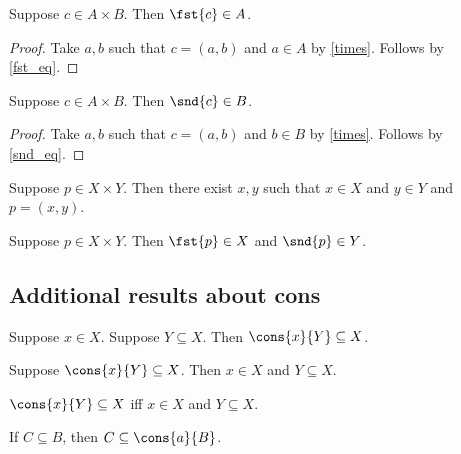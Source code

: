 \begin{proposition}\label{fst_type}
    Suppose $c\in A\times B$. Then $\fst{c}\in A$.
\end{proposition}
\begin{proof}
    Take $a, b$ such that $c = (a, b)$ and $a\in A$
        by \cref{times}.
    Follows by \cref{fst_eq}.
\end{proof}

\begin{proposition}\label{snd_type}
    Suppose $c\in A\times B$. Then $\snd{c}\in B$.
\end{proposition}
\begin{proof}
    Take $a, b$ such that $c = (a, b)$ and $b\in B$
        by \cref{times}.
    Follows by \cref{snd_eq}.
\end{proof}

\begin{proposition}\label{times_elem_is_tuple}
    Suppose $p\in X\times Y$. Then there exist $x, y$
    such that $x\in X$ and $y\in Y$ and $p = (x, y)$.
\end{proposition}


\begin{proposition}\label{times_proj_elim}
    Suppose $p\in X\times Y$. Then $\fst{p}\in X$ and $\snd{p}\in Y$.
\end{proposition}
\subsection{Additional results about cons}

\begin{proposition}\label{cons_subseteq_intro}
    Suppose $x\in X$.
    Suppose $Y\subseteq X$.
    Then $\cons{x}{Y}\subseteq X$.
\end{proposition}

\begin{proposition}\label{cons_subseteq_elim}
    Suppose $\cons{x}{Y}\subseteq X$.
    Then $x\in X$ and $Y\subseteq X$.
\end{proposition}

\begin{proposition}\label{cons_subseteq_iff}
    $\cons{x}{Y}\subseteq X$ iff $x\in X$ and $Y\subseteq X$.
\end{proposition}

\begin{proposition}\label{subseteq_cons_right}
    If $C\subseteq B$, then $C\subseteq \cons{a}{B}$.
\end{proposition}

